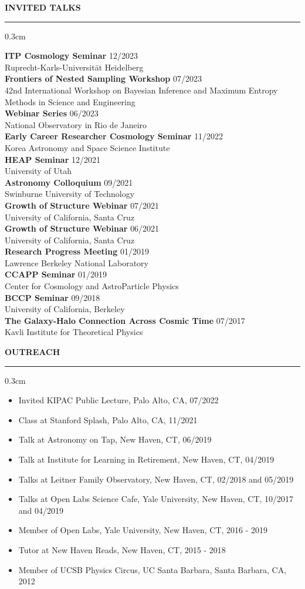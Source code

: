 \documentclass[12pt]{article}
\renewenvironment{section}[1]
  {
  \medskip
  {\color{yaleblue} \MakeUppercase{\bf #1}}
  \smallskip
  \hrule
  \medskip
  \begin{adjustwidth}{0.3cm}{}
  }
  {
  \end{adjustwidth}
  }
\newcommand{\entry}[3]{{\bf #1} \hfill {#2} \\ {#3}}
\begin{document}
\begin{section}{Invited Talks}
  \entry{ITP Cosmology Seminar}{12/2023}{Ruprecht-Karls-Universität Heidelberg} \medskip \\
  \entry{Frontiers of Nested Sampling Workshop}{07/2023}{42nd  International Workshop on Bayesian Inference and Maximum Entropy Methods in Science and Engineering} \medskip \\
  \entry{Webinar Series}{06/2023}{National Observatory in Rio de Janeiro} \medskip \\
  \entry{Early Career Researcher Cosmology Seminar}{11/2022}{Korea Astronomy and Space Science Institute} \medskip \\
  \entry{HEAP Seminar}{12/2021}{University of Utah} \medskip \\
  \entry{Astronomy Colloquium}{09/2021}{Swinburne University of Technology} \medskip \\
  \entry{Growth of Structure Webinar}{07/2021}{University of California, Santa Cruz} \medskip \\
  \entry{Growth of Structure Webinar}{06/2021}{University of California, Santa Cruz} \medskip \\
  \entry{Research Progress Meeting}{01/2019}{Lawrence Berkeley National Laboratory} \medskip \\
  \entry{CCAPP Seminar}{01/2019}{Center for Cosmology and AstroParticle Physics} \medskip \\
  \entry{BCCP Seminar}{09/2018}{University of California, Berkeley} \medskip \\
  \entry{The Galaxy-Halo Connection Across Cosmic Time}{07/2017}{Kavli Institute for Theoretical Physics}
\end{section}

\begin{section}{Outreach}
  \begin{itemize}[leftmargin=0.5cm, topsep=0pt, itemsep=0pt, partopsep=0pt, parsep=0pt]
    \item Invited KIPAC Public Lecture, Palo Alto, CA, 07/2022
    \item Class at Stanford Splash, Palo Alto, CA, 11/2021
    \item Talk at Astronomy on Tap, New Haven, CT, 06/2019
    \item Talk at Institute for Learning in Retirement, New Haven, CT, 04/2019
    \item Talks at Leitner Family Observatory, New Haven, CT, 02/2018 and 05/2019
    \item Talks at Open Labs Science Cafe, Yale University, New Haven, CT, 10/2017 and 04/2019
    \item Member of Open Labs, Yale University, New Haven, CT, 2016 - 2019
    \item Tutor at New Haven Reads, New Haven, CT, 2015 - 2018
    \item Member of UCSB Physics Circus, UC Santa Barbara, Santa Barbara, CA, 2012
  \end{itemize}
\end{section}
\end{document}
